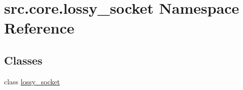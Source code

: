 \hypertarget{namespacesrc_1_1core_1_1lossy__socket}{}\section{src.\+core.\+lossy\+\_\+socket Namespace Reference}
\label{namespacesrc_1_1core_1_1lossy__socket}
\subsection*{Classes}
\begin{DoxyCompactItemize}
\item 
class \hyperlink{classsrc_1_1core_1_1lossy__socket_1_1lossy__socket}{lossy\+\_\+socket}
\end{DoxyCompactItemize}
